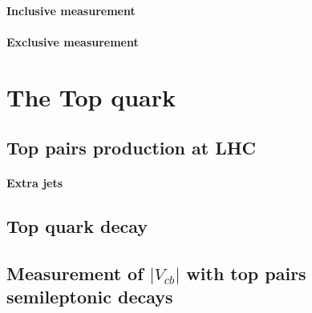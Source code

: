 \paragraph*{Inclusive measurement}

\paragraph*{Exclusive measurement}


\section{The Top quark}
\subsection{Top pairs production at LHC}
\paragraph*{Extra jets}
\subsection{Top quark decay}
\subsection{Measurement of $|V_{cb}|$ with top pairs semileptonic decays}